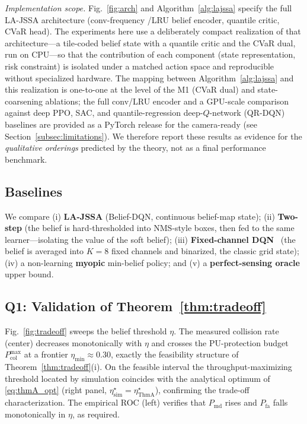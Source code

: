 \documentclass[journal]{IEEEtran}
\newcommand{\Pmd}{P_{\mathrm{md}}}         %
\newcommand{\Pfa}{P_{\mathrm{fa}}}         %
\newcommand{\thr}{\eta}                    %
\newcommand{\Pcolmax}{P_{\mathrm{col}}^{\max}} %
\begin{document}
\emph{Implementation scope.} Fig.~\ref{fig:arch} and
Algorithm~\ref{alg:lajssa} specify the full LA-JSSA architecture (conv-frequency
/LRU belief encoder, quantile critic, CVaR head). The experiments here use a
deliberately compact realization of that architecture---a tile-coded belief
state with a quantile critic and the CVaR dual, run on CPU---so that the
contribution of each component (state representation, risk constraint) is
isolated under a matched action space and reproducible without specialized
hardware. The mapping between Algorithm~\ref{alg:lajssa} and this realization
is one-to-one at the level of the M1 (CVaR dual) and state-coarsening
ablations; the full conv/LRU encoder and a GPU-scale comparison against deep
PPO, SAC, and quantile-regression deep-$Q$-network (QR-DQN) baselines are
provided as a PyTorch release for the camera-ready (see
Section~\ref{subsec:limitations}). We therefore report these results as
evidence for the \emph{qualitative orderings} predicted by the theory, not as
a final performance benchmark.

\subsection{Baselines}
We compare (i) \textbf{LA-JSSA} (Belief-DQN, continuous belief-map state);
(ii) \textbf{Two-step} (the belief is hard-thresholded into NMS-style boxes,
then fed to the same learner---isolating the value of the soft belief);
(iii) \textbf{Fixed-channel DQN}~\cite{wang2018} (the belief is averaged into
$K=8$ fixed channels and binarized, the classic grid state);
(iv) a non-learning \textbf{myopic} min-belief policy; and (v) a
\textbf{perfect-sensing oracle} upper bound.

\subsection{Q1: Validation of Theorem~\ref{thm:tradeoff}}
Fig.~\ref{fig:tradeoff} sweeps the belief threshold $\thr$. The measured
collision rate (center) decreases monotonically with $\thr$ and crosses the
PU-protection budget $\Pcolmax$ at a frontier $\thr_{\min}\approx0.30$,
exactly the feasibility structure of Theorem~\ref{thm:tradeoff}(i). On the
feasible interval the throughput-maximizing threshold located by simulation
coincides with the analytical optimum of \eqref{eq:thmA_opt} (right panel,
$\thr^\star_{\mathrm{sim}}=\thr^\star_{\mathrm{Thm A}}$), confirming the
trade-off characterization. The empirical ROC (left) verifies that $\Pmd$
rises and $\Pfa$ falls monotonically in $\thr$, as required.
\end{document}
